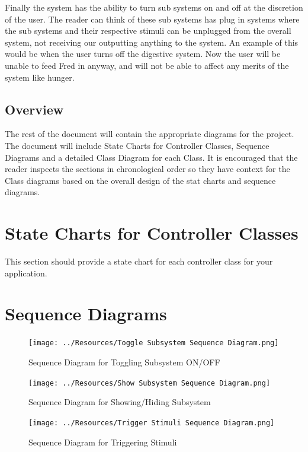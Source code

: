 \documentclass[]{article}
\begin{document}
Finally the system has the ability to turn sub systems on and off at the discretion of the user. The reader can think of these sub systems has plug in systems where the sub systems and their respective stimuli can be unplugged from the overall system, not receiving our outputting anything to the system. An example of this would be when the user turns off the digestive system. Now the user will be unable to feed Fred in anyway, and will not be able to affect any merits of the system like hunger.

\subsection{Overview}
\label{sub:overview}
The rest of the document will contain the appropriate diagrams for the project. The document will include State Charts for Controller Classes, Sequence Diagrams and a detailed Class Diagram for each Class. It is encouraged that the reader inspects the sections in chronological order so they have context for the Class diagrams based on the overall design of the stat charts and sequence diagrams.



\section{State Charts for Controller Classes}
\label{sec:state_charts_for_controller_classes}
This section should provide a state chart for each controller class for your 
application.\\

\section{Sequence Diagrams}
\label{sec:sequence_diagrams}
\begin{figure}[H]
	\texttt{[image: ../Resources/Toggle Subsystem 
	Sequence 
	Diagram.png]}
	\caption{Sequence Diagram for Toggling Subsystem ON/OFF}
\end{figure}
\begin{figure}[H]
	\texttt{[image: ../Resources/Show Subsystem Sequence 
	Diagram.png]}
	\caption{Sequence Diagram for Showing/Hiding Subsystem}
\end{figure}
\begin{figure}[H]
	\texttt{[image: ../Resources/Trigger Stimuli Sequence 
	Diagram.png]}
	\caption{Sequence Diagram for Triggering Stimuli}
\end{figure}
\end{document}
